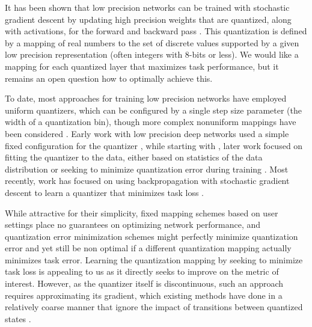 \documentclass{article}
\begin{document}
It has been shown that low precision networks can be trained with stochastic gradient descent by updating high precision weights that are quantized, along with activations, for the forward and backward pass \citep{courbariaux2015binaryconnect, Esser11441}.
This quantization is defined by a mapping of real numbers to the set of discrete values supported by a given low precision representation (often integers with 8-bits or less).
We would like a mapping for each quantized layer that maximizes task performance,
but it remains an open question how to optimally achieve this.

To date, most approaches for training low precision networks have employed uniform quantizers, which can be configured by a single step size parameter (the width of a quantization bin), though more complex nonuniform mappings have been considered \citep{polino2018model}.
Early work with low precision deep networks used a simple fixed configuration for the quantizer \citep{hubara2016binarized,Esser11441},
while starting with \citet{rastegari2016xnor}, later work focused on fitting the quantizer to the data, either based on statistics of the data distribution \citep{li2016ternary,zhou2016dorefa,cai2017deep,mckinstry2018discovering} or seeking to minimize quantization error during training \citep{choi2018learning,zhang2018lq}.
Most recently, work has focused on using backpropagation with stochastic gradient descent to learn a quantizer that minimizes task loss \citep{DBLP:journals/corr/ZhuHMD16,mishra2017apprentice,choi2018pact,choi2018bridging,jung2018joint,baskin2018nice,polino2018model}.




While attractive for their simplicity, fixed mapping schemes based on user settings place no guarantees on optimizing network performance,
and quantization error minimization schemes might perfectly minimize quantization error and yet still be non optimal if a different quantization mapping actually minimizes task error.
Learning the quantization mapping by seeking to minimize task loss is appealing to us as it directly seeks to improve on the metric of interest. 
However, as the quantizer itself is discontinuous, such an approach requires approximating its gradient, which existing methods have done in a relatively coarse manner that ignore the impact of transitions between quantized states \citep{choi2018pact,choi2018bridging,jung2018joint}.
\end{document}

